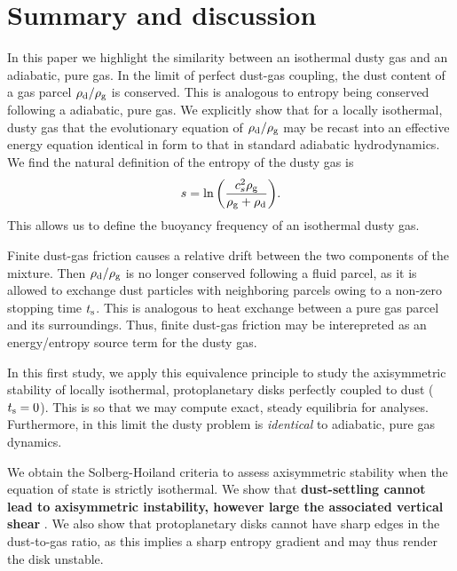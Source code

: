 \section{Summary and discussion}
In this paper we highlight the similarity between an isothermal 
dusty gas and an adiabatic, pure gas. 
In the limit of perfect dust-gas coupling, the dust content of a gas 
parcel $\rho_\mathrm{d}/\rho_\mathrm{g}$ is conserved. This is analogous to entropy being 
conserved following a adiabatic, pure gas. %
We explicitly show that for 
a locally isothermal, dusty gas that the evolutionary equation of 
$\rho_\mathrm{d}/\rho_\mathrm{g}$ may be recast into an effective energy equation identical
in form to that in standard adiabatic hydrodynamics. We find the 
natural definition of the entropy of the dusty gas is 
\begin{align*}
  s  = \ln{\left(\frac{c_s^2\rho_\mathrm{g}}{\rho_\mathrm{g}+\rho_\mathrm{d}}\right)}.  
\end{align*}
This allows us to define the buoyancy frequency of an isothermal 
dusty gas. 

%

Finite dust-gas friction causes a relative drift between the two
components of the mixture. Then $\rho_\mathrm{d}/\rho_\mathrm{g} $ is no
longer conserved following a fluid parcel, as it is allowed to
exchange dust particles with neighboring parcels owing to a non-zero
stopping time $t_\mathrm{s}$. This is analogous to heat exchange between a 
pure gas parcel and its surroundings. Thus, finite dust-gas friction
may be interepreted as an energy/entropy source term for the dusty
gas.   

%
In this first study, we apply this equivalence principle to study the
axisymmetric stability of locally isothermal, protoplanetary disks
perfectly coupled to dust ($t_\mathrm{s}=0$). This is so that we may 
compute exact, steady equilibria for analyses. Furthermore,
in this limit the dusty problem is \emph{identical} to adiabatic, pure
gas dynamics. 

We obtain the Solberg-Hoiland criteria to assess
axisymmetric stability when the equation of state is strictly
isothermal. We show that {\bf dust-settling cannot lead to
  axisymmetric instability, however large the associated vertical
  shear} \citep[cf. \emph{non-axisymmetric} Kelvin-Helmholtz instabilities
  induced by  dust-settling, ][]{lee10}. We  also show that
protoplanetary disks cannot have sharp edges in the dust-to-gas ratio,
as this implies a sharp entropy gradient and may thus render the disk
unstable.  

